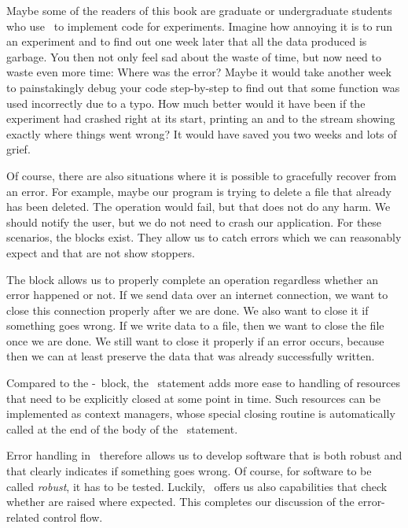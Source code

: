 Maybe some of the readers of this book are graduate or undergraduate students who use \python\ to implement code for experiments.
Imagine how annoying it is to run an experiment and to find out one week later that all the data produced is garbage.
You then not only feel sad about the waste of time, but now need to waste even more time:
Where was the error?
Maybe it would take another week to painstakingly debug your code step-by-step to find out that some function was used incorrectly due to a typo.
How much better would it have been if the experiment had crashed right at its start, printing an  and  to the  stream showing exactly where things went wrong?
It would have saved you two weeks and lots of grief.

Of course, there are also situations where it is possible to gracefully recover from an error.
For example, maybe our program is trying to delete a file that already has been deleted.
The operation would fail, but that does not do any harm.
We should notify the user, but we do not need to crash our application.
For these scenarios, the  blocks exist.
They allow us to catch errors which we can reasonably expect and that are not show stoppers.

The  block allows us to properly complete an operation regardless whether an error happened or not.
If we send data over an internet connection, we want to close this connection properly after we are done.
We also want to close it if something goes wrong.
If we write data to a file, then we want to close the file once we are done.
We still want to close it properly if an error occurs, because then we can at least preserve the data that was already successfully written.

Compared to the -~block, the ~statement adds more ease to handling of resources that need to be explicitly closed at some point in time.
Such resources can be implemented as context managers, whose special closing routine is automatically called at the end of the body of the ~statement.

Error handling in \python\ therefore allows us to develop software that is both robust and that clearly indicates if something goes wrong.
Of course, for software to be called \emph{robust}, it has to be tested.
Luckily, \pytest\ offers us also  capabilities that check whether  are raised where expected.
This completes our discussion of the error-related control flow.%
\endhsection%
%
\FloatBarrier%
\endhsection%
%
